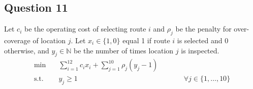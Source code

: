 \subsection*{Question 11}
Let $c_i$ be the operating cost of selecting route $i$ and $\rho_j$ be the penalty for over-coverage of location $j$. Let $x_i \in \{1,0\}$ equal 1 if route $i$ is selected and 0 otherwise, and $y_j \in \mathbb{N}$ be the number of times location $j$ is inspected.
\begin{align}
    \min \quad & \sum_{i=1}^{12} c_i  x_i  + \sum_{j=1}^{10}\rho_j (y_j-1) && \label{eq:q11obj}\\
    \text{s.t.} \quad & y_j \geq 1 && \qquad \forall j \in \{1,\dots,10\} \label{eq:q11assign}\\

\end{align}